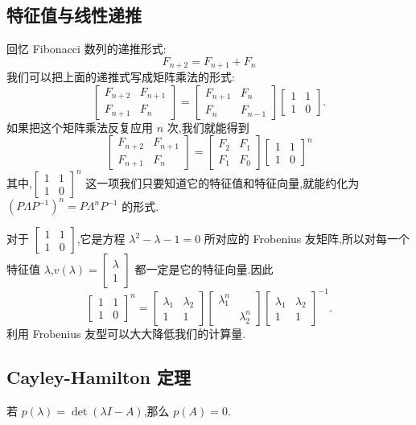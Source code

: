 \subsection{特征值与线性递推}

回忆 Fibonacci 数列的递推形式:
\[
    F_{n+2} = F_{n+1} + F_n
\]
我们可以把上面的递推式写成矩阵乘法的形式:
\[
    \begin{bmatrix}
        F_{n+2} & F_{n+1} \\
        F_{n+1} & F_n
    \end{bmatrix}
    =
    \begin{bmatrix}
        F_{n+1} & F_n \\
        F_n & F_{n-1}
    \end{bmatrix}
    \begin{bmatrix}
        1 & 1 \\
        1 & 0
    \end{bmatrix}.
\]
如果把这个矩阵乘法反复应用 $n$ 次,我们就能得到
\[
    \begin{bmatrix}
        F_{n+2} & F_{n+1} \\
        F_{n+1} & F_n
    \end{bmatrix}
    =
    \begin{bmatrix}
        F_2 & F_1 \\
        F_1 & F_0
    \end{bmatrix}
    \begin{bmatrix}
        1 & 1 \\
        1 & 0
    \end{bmatrix}^n
\]
其中,$\begin{bmatrix}1 & 1 \\ 1 & 0\end{bmatrix}^n$ 这一项我们只要知道它的特征值和特征向量,就能约化为 $(P\Lambda P^{-1})^n = P\Lambda^n P^{-1}$ 的形式.

对于 $\begin{bmatrix}1 & 1 \\ 1 & 0\end{bmatrix}$,它是方程 $\lambda^2 - \lambda - 1 = 0$ 所对应的 Frobenius 友矩阵,所以对每一个特征值 $\lambda$,$v(\lambda) = \begin{bmatrix}\lambda \\ 1\end{bmatrix}$ 都一定是它的特征向量.因此
\[
    \begin{bmatrix}
        1 & 1 \\
        1 & 0
    \end{bmatrix}^n
    =
    \begin{bmatrix}
        \lambda_1 & \lambda_2 \\
        1 & 1
    \end{bmatrix}
    \begin{bmatrix}
        \lambda_1^n & \\
        & \lambda_2^n
    \end{bmatrix}
    \begin{bmatrix}
        \lambda_1 & \lambda_2 \\
        1 & 1
    \end{bmatrix}^{-1}.
\]
利用 Frobenius 友型可以大大降低我们的计算量.

\subsection{Cayley-Hamilton 定理}

若 $p(\lambda) = \det(\lambda I - A)$,那么 $p(A) = 0$.
